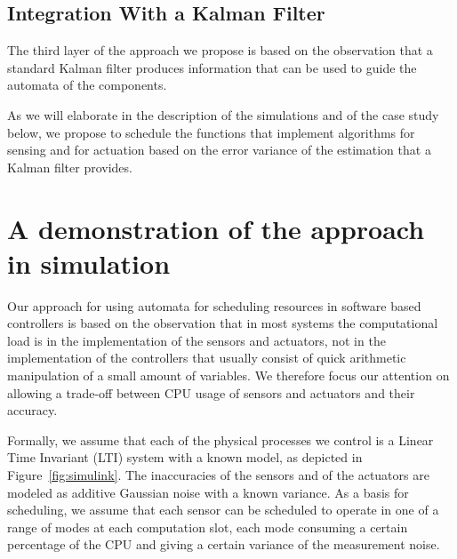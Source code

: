 \documentclass{sig-alternate-ipsn13}
\begin{document}
\subsection{Integration With a Kalman Filter}
The third layer of the approach we propose is based on the observation that a standard Kalman filter produces information that can be used to guide the automata of the components. 

As we will elaborate in the description of the simulations and of the case study below, we propose to schedule the functions that implement algorithms for sensing and for actuation based on the error variance of the estimation that a Kalman filter provides. 



\section{A demonstration of the approach in simulation}
\label{sec:simulation}

Our approach for using automata for scheduling resources in software based controllers is based on the observation that in most systems the computational load is in the implementation of the sensors and actuators, not in the implementation of the controllers that usually consist of quick arithmetic manipulation of a small amount of variables. We therefore focus our attention on allowing a trade-off between CPU usage of sensors and actuators and their accuracy. %


Formally, we assume that each of the physical processes we control is a Linear Time Invariant (LTI) system with a known model, as depicted in Figure~\ref{fig:simulink}. The inaccuracies of the sensors and of the actuators are modeled as additive Gaussian noise with a known variance. As a basis for scheduling, we assume that each sensor can be scheduled to operate in one of a range of modes at each computation slot, each mode consuming a certain percentage of the CPU and giving a certain variance of the measurement noise.
\end{document}
